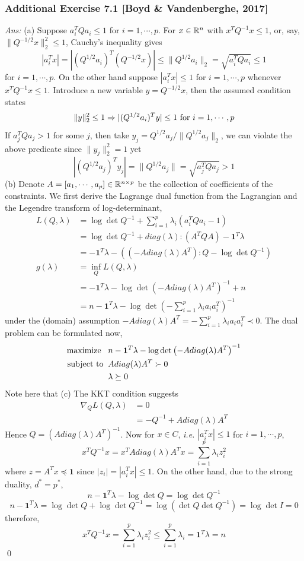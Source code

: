 \documentclass[12pt,a4paper]{article}
\newcommand{\ra}[1]{\ifnum #1=1\rightarrow\fi\ifnum #1=2\Rightarrow\fi\ifnum #1=3\Rrightarrow\fi\ifnum #1=4\rightrightarrows\fi\ifnum #1=5\rightleftarrows\fi\ifnum #1=6\mapsto\fi\ifnum #1=7\fi\ifnum #1=8\twoheadrightarrow\fi\ifnum #1=9\rightharpoonup\fi\ifnum #1=0\rightharpoondown\fi}
\renewcommand{\l}{\left}\renewcommand{\r}{\right}
\newcommand{\SUM}[2]{\sum\limits_{#1}^{#2}}
\newcommand{\x}{\times}
\newcommand\ie{{\it i.e. }}
\def\R{\ifmmode\mathbb R\fi}
\begin{document}
\newpage\subsubsection*{Additional Exercise 7.1 [Boyd \& Vandenberghe, 2017]}
{\it Ans:} (a) Suppose $a_i^TQa_i \leq 1$ for $i=1,\cdots,p$. For $x\in\R^n$ with $x^TQ^{-1}x\leq 1$, or, say, $\|Q^{-1/2}x\|_2^2 \leq 1$, Cauchy's inequality gives
$$|a_i^Tx| = |(Q^{1/2}a_i)^T (Q^{-1/2}x)| \leq \|Q^{1/2}a_i\|_2 = \sqrt{a_i^TQa_i} \leq 1$$
for $i=1,\cdots, p$. On the other hand suppose $|a_i^Tx|\leq 1$ for $i=1,\cdots, p$ whenever $x^TQ^{-1}x \leq 1$. Introduce a new variable $y = Q^{-1/2}x$, then the assumed condition states 
$$\|y\|_2^2 \leq 1 \ra2 |(Q^{1/2}a_i)^T y|\leq 1 \mbox{ for } i = 1,\cdots, p$$
If $a_j^TQa_j > 1$ for some $j$, then take $y_j = Q^{1/2}a_j / \|Q^{1/2}a_j\|_2$, we can violate the above predicate since $\|y_j\|_2^2 = 1$ yet 
$$|(Q^{1/2}a_j)^T y_j| = \|Q^{1/2}a_j\| = \sqrt{a_j^TQa_j} > 1$$
(b) Denote $A = [a_1, \cdots, a_p] \in \R^{n\x p}$ be the collection of coefficients of the constraints. We first derive the Lagrange dual function from the Lagrangian and the Legendre transform of log-determinant,
\begin{align*}
L(Q, \lambda) &= \log \det Q^{-1} + \SUM{i=1}p \lambda_i(a_i^TQa_i - 1)\\
&= \log \det Q^{-1} + diag(\lambda) : (A^TQA) - \mathbf1^T\lambda\\
&= -\mathbf1^T\lambda - \l((-Adiag(\lambda)A^T) : Q - \log \det Q^{-1}\r)\\
g(\lambda) &= \inf_Q L(Q, \lambda) \\
&= -\mathbf1^T\lambda - \log\det(-Adiag(\lambda)A^T)^{-1} + n \\
&= n -\mathbf1^T\lambda - \log\det\l(-\SUM{i=1}p \lambda_ia_ia_i^T\r)^{-1}
\end{align*}
under the (domain) assumption $-Adiag(\lambda)A^T = -\SUM{i=1}p \lambda_ia_ia_i^T\prec 0$. The dual problem can be formulated now, 
\begin{align*}
\mbox{maximize\;\;\;} & n -\mathbf1^T\lambda - \log\det\l(-Adiag(\lambda)A^T \r)^{-1} \\
\mbox{subject to\;\;} & Adiag(\lambda)A^T \succ 0 \\
& \lambda \succeq 0
\end{align*}
Note here that 
(c) The KKT condition suggests 
\begin{align*}
\nabla_Q L(Q, \lambda) &= 0\\
&= -Q^{-1} + Adiag(\lambda)A^T
\end{align*}
Hence $Q = (Adiag(\lambda)A^T)^{-1}$. Now for $x\in C$, \ie $|a_i^Tx|\leq 1$ for $i=1,\cdots, p$, 
$$x^TQ^{-1}x = x^TAdiag(\lambda)A^Tx = \SUM{i=1}p\lambda_i z_i^2$$
where $z = A^Tx \preceq \mathbf1$ since $|z_i|  = |a_i^Tx|\leq 1$. On the other hand, due to the strong duality, $d^\ast = p^\ast$, 
$$n - \mathbf1^T\lambda - \log\det Q = \log\det Q^{-1}$$
$$n - \mathbf1^T\lambda = \log\det Q + \log\det Q^{-1} = \log (\det Q \det Q^{-1}) = \log\det I = 0 $$
therefore,
$$x^T Q^{-1}x = \SUM{i=1}p \lambda_i z_i^2 \leq \SUM{i=1}p \lambda_i = \mathbf1^T\lambda = n$$\qed
\end{document}
